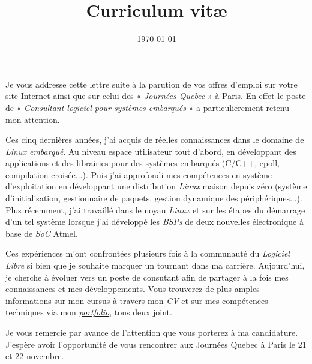 \documentclass[11pt,a4paper,sans]{moderncv}
\title{Curriculum vit\ae}
\date{\today}
\begin{document}
\makelettertitle

Je vous addresse cette lettre suite à la parution de vos offres d'emploi sur votre \href{https://carrieres.savoirfairelinux.com/}{site Internet} ainsi que sur celui des « \href{http://journeesquebec.gouv.qc.ca/}{\textit{Journées Quebec}} » à Paris. En effet le poste de « \href{https://carrieres.savoirfairelinux.com/#consultant-logiciel-pour-systemes-embarques}{\textit{Consultant logiciel pour systèmes embarqués}} » a particulierement retenu mon attention.

Ces cinq dernières années, j'ai acquis de réelles connaissances dans le domaine de \textit{Linux embarqué}. Au niveau espace utilisateur tout d'abord, en développant des applications et des librairies pour des systèmes embarqués (C/C++, epoll, compilation-croisée...). Puis j'ai approfondi mes compétences en système d'exploitation en développant une distribution \textit{Linux} maison depuis zéro (système d'initialisation, gestionnaire de paquets, gestion dynamique des périphériques...). Plus récemment, j'ai travaillé dans le noyau \textit{Linux} et sur les étapes du démarrage d'un tel système lorsque j'ai développé les \textit{BSPs} de deux nouvelles électronique à base de \textit{SoC} Atmel.

Ces expériences m'ont confrontées plusieurs fois à la communauté du \textit{Logiciel Libre} si bien que je souhaite marquer un tournant dans ma carrière. Aujourd'hui, je cherche à évoluer vers un poste de consutant afin de partager à la fois mes connaissances et mes développements. Vous trouverez de plus amples informations sur mon cursus à travers mon \href{http://portay.fr/journees-quebec/pdf/french.pdf}{\textit{CV}} et sur mes compétences techniques via mon \href{http://portay.fr/journees-quebec/pdf/portfolio-french.pdf}{\textit{portfolio}}, tous deux joint.

Je vous remercie par avance de l'attention que vous porterez à ma candidature. J'espère avoir l'opportunité de vous rencontrer aux Journées Quebec à Paris le 21 et 22 novembre.

\makeletterclosing
\end{document}
